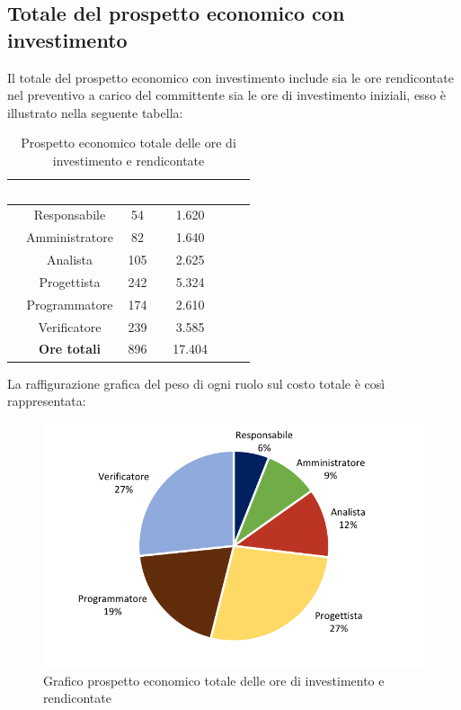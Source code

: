 \subsection{Totale del prospetto economico con investimento}
Il totale del prospetto economico con investimento include sia le ore rendicontate nel preventivo a carico del committente sia  le ore  di investimento iniziali, esso è illustrato nella seguente tabella:

\begin{table}[ht]
	\begin{center}
		\begin{tabular}{cccccc}
			\rowcolor{coolblack}
			\hline
			&\textcolor{white}{Ruolo}&	\textcolor{white}{Ore} &\textcolor{white}{Costo(\euro)} \\
			\hline
			&Responsabile           &54&1.620\\
			&Amministratore        & 82& 1.640 \\
			&Analista                   & 105& 2.625\\
			&Progettista              &  242& 5.324\\
			&Programmatore       & 174& 2.610 \\
			&Verificatore             & 239& 3.585\\
			\hline
			&\textbf{Ore totali}    &896&17.404\\
		\end{tabular}
		\caption{Prospetto economico totale delle ore di investimento e rendicontate }
	\end{center}
\end{table}

La raffigurazione grafica del peso di ogni ruolo sul costo totale è così rappresentata:
\begin{figure}[!ht]
	\begin{center}
		\includegraphics[scale=0.90]{images/grafoOreInvestimentoEuro.png}
		\caption{Grafico prospetto economico totale delle ore di investimento e rendicontate}
	\end{center}
\end{figure}
